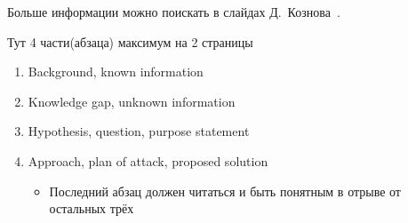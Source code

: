 
Больше информации можно поискать в слайдах Д.~Кознова~\cite{koznov}.

Тут  4 части(абзаца) максимум на 2 страницы
\begin{enumerate}
\item Background, known information
\item Knowledge gap, unknown information
\item  Hypothesis, question, purpose statement 
\item Approach, plan of attack, proposed solution
\begin{itemize}
\item Последний абзац должен читаться и быть понятным в отрыве от остальных трёх
\end{itemize}
\end{enumerate}